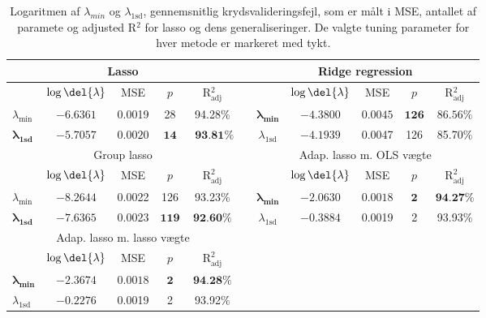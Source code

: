 \begin{table}[ht]
\center
\begin{tabular}{lcccc | lccccc}
\toprule
   \multicolumn{5}{c}{Lasso} & \multicolumn{1}{c}{ }&  \multicolumn{5}{c}{Ridge regression}  \\ \midrule
 & \(\log \del{\lambda}\) & MSE & $p$ & R$^2_{\text{adj}}$ &&& \(\log \del{\lambda}\) & MSE & $p$ & R$^2_{\text{adj}}$\\
 $\lambda_{\min}$ &$-6.6361$& 0.0019 & 28 & 94.28\% &&  $\boldsymbol{\lambda_{\min}}$ &  $\mathbf{-4.3800}$ &   $\mathbf{0.0045} $&  $\mathbf{126}$ & $ \mathbf{86.56 \% }$ \\ 
 $\boldsymbol{\lambda}_{\textbf{1sd}}$ & $\mathbf{-5.7057}$ & $\mathbf{0.0020} $ & $\mathbf{14}$ &$\textbf{ 93.81} \boldsymbol{\%}$ && $\lambda_{ \text{1sd}}$& $-4.1939$ & 0.0047 & 126 &  85.70\%  \\ \bottomrule \toprule
\multicolumn{5}{c}{Group lasso}  &&  \multicolumn{5}{c}{Adap. lasso m. OLS vægte}  \\ \midrule
& \(\log \del{\lambda}\) & MSE &$ p $ &R$^2_{\text{adj}}$&&& \(\log \del{\lambda}\) & MSE & $p$ & R$^2_{\text{adj}}$ \\
$\lambda_{\min}$& $-8.2644$ & 0.0022  & 126 & 93.23\% && $\boldsymbol{\lambda_{\min}}$  & $\mathbf{-2.0630}$ &$ \mathbf{0.0018}$ & $\mathbf{2}$ & $\textbf{94.27} \%$ \\
  $\boldsymbol{\lambda}_{\textbf{1sd}}$  & $\mathbf{-7.6365}$ &$ \mathbf{0.0023}$ & $\mathbf{119}$ &$ \textbf{92.60} \%$ &&  $\lambda_{1\text{sd}}$ & $-0.3884$ & 0.0019 & 2 &  93.93\%\\  \bottomrule 
  \toprule
  \multicolumn{5}{c}{Adap. lasso m. lasso vægte}  \\ \cmidrule{1-5}
& \(\log \del{\lambda}\) & MSE & $p$ & R$^2_{\text{adj}}$\\
$\boldsymbol{\lambda_{\min}}$   &  $ \mathbf{-2.3674}$ & $ \mathbf{0.0018} $& $ \mathbf{2}$ &   $\textbf{94.28} \%$ \\
$\lambda_{1\text{sd}}$  & $-0.2276$ & 0.0019 & 2 & 93.92\%\\ \cmidrule{1-5}
 \end{tabular}
\caption{Logaritmen af $\lambda_{min}$ og $\lambda_{1\text{sd}}$, gennemsnitlig krydsvalideringsfejl, som er målt i MSE, antallet af paramete og adjusted R$^2$ for lasso og dens generaliseringer. De valgte tuning parameter for hver metode er markeret med tykt.} \label{tab:cv_tab}
\end{table}
